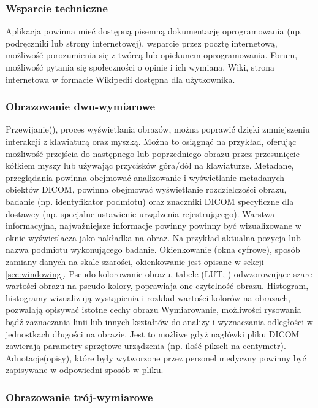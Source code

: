 \subsubsection{Wsparcie techniczne}

Aplikacja powinna mieć dostępną pisemną dokumentację oprogramowania (np. podręczniki lub strony internetowej), wsparcie przez pocztę internetową, możliwość porozumienia się z twórcą lub opiekunem oprogramowania.
Forum, możliwość pytania się społeczności o opinie i ich wymiana.
Wiki, strona internetowa w formacie Wikipedii dostępna dla użytkownika.

\subsubsection{Obrazowanie dwu-wymiarowe}

Przewijanie(), proces wyświetlania obrazów, można poprawić dzięki zmniejszeniu interakcji z klawiaturą oraz myszką. Można to osiągnąć na przykład, oferując możliwość przejścia do następnego lub poprzedniego obrazu przez przesunięcie kółkiem myszy lub używając przycisków góra/dół na klawiaturze.
Metadane, przeglądania powinna obejmować analizowanie i wyświetlanie metadanych obiektów DICOM, powinna obejmować wyświetlanie rozdzielczości obrazu, badanie (np. identyfikator podmiotu) oraz znaczniki DICOM specyficzne dla dostawcy (np. specjalne ustawienie urządzenia rejestrującego).
Warstwa informacyjna, najważniejsze informacje powinny powinny być wizualizowane w oknie wyświetlacza jako nakładka na obraz.
Na przykład aktualna pozycja lub nazwa podmiotu wykonującego badanie.
Okienkowanie (okna cyfrowe), sposób zamiany danych na skale szarości, okienkowanie jest opisane w sekcji \ref{sec:windowing}.
Pseudo-kolorowanie obrazu, tabele (LUT, ) odwzorowujące szare wartości obrazu na pseudo-kolory, poprawiaja one czytelność obrazu.
Histogram, histogramy wizualizują wystąpienia i rozkład wartości kolorów na obrazach, pozwalają opisywać istotne cechy obrazu
Wymiarowanie, możliwości rysowania bądź zaznaczania linii lub innych kształtów do analizy i wyznaczania odległości w jednostkach długości na obrazie.
Jest to możliwe gdyż nagłówki pliku DICOM zawierają parametry sprzętowe urządzenia (np. ilość pikseli na centymetr).
Adnotacje(opisy), które były wytworzone przez personel medyczny powinny być zapisywane w odpowiedni sposób w pliku.

\subsubsection{Obrazowanie trój-wymiarowe}

